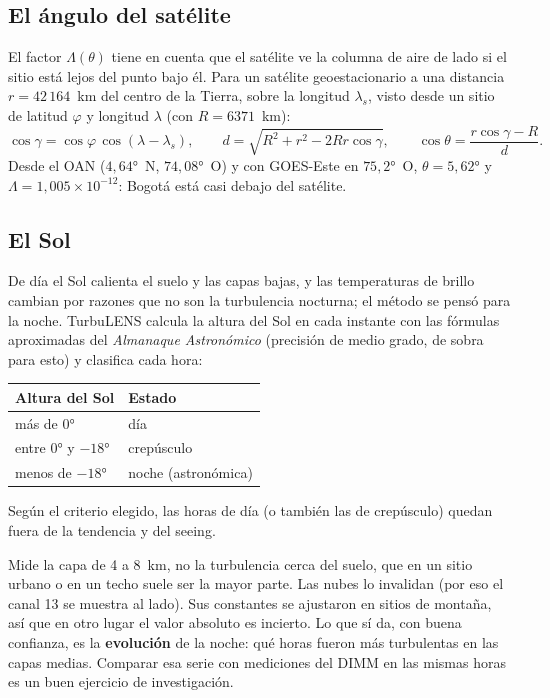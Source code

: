 \subsection{El ángulo del satélite}

El factor $\Lambda(\theta)$ tiene en cuenta que el satélite ve la columna de aire de lado si el sitio está lejos del punto
bajo él. Para un satélite geoestacionario a una distancia $r = 42\,164$~km del centro de la Tierra, sobre la longitud
$\lambda_s$, visto desde un sitio de latitud $\varphi$ y longitud $\lambda$ (con $R = 6371$~km):
\begin{equation}
\cos\gamma = \cos\varphi\,\cos(\lambda - \lambda_s),\qquad
d = \sqrt{R^2 + r^2 - 2Rr\cos\gamma},\qquad
\cos\theta = \frac{r\cos\gamma - R}{d}.
\end{equation}
Desde el OAN ($4{,}64°$~N, $74{,}08°$~O) y con GOES-Este en $75{,}2°$~O, $\theta = 5{,}62°$ y $\Lambda = 1{,}005\times10^{-12}$:
Bogotá está casi debajo del satélite.

\subsection{El Sol}

De día el Sol calienta el suelo y las capas bajas, y las temperaturas de brillo cambian por razones que no son la
turbulencia nocturna; el método se pensó para la noche. TurbuLENS calcula la altura del Sol en cada instante con las
fórmulas aproximadas del \emph{Almanaque Astronómico} (precisión de medio grado, de sobra para esto) y clasifica cada hora:
\begin{center}\small
\begin{tabular}{@{}l l@{}}
\toprule
Altura del Sol & Estado\\
\midrule
más de 0° & día\\
entre 0° y $-18°$ & crepúsculo\\
menos de $-18°$ & noche (astronómica)\\
\bottomrule
\end{tabular}
\end{center}
Según el criterio elegido, las horas de día (o también las de crepúsculo) quedan fuera de la tendencia y del seeing.

\begin{nota}
Mide la capa de 4 a 8~km, no la turbulencia cerca del suelo, que en un sitio urbano o en un techo suele ser la mayor
parte. Las nubes lo invalidan (por eso el canal 13 se muestra al lado). Sus constantes se ajustaron en sitios de
montaña, así que en otro lugar el valor absoluto es incierto. Lo que sí da, con buena confianza, es la \textbf{evolución}
de la noche: qué horas fueron más turbulentas en las capas medias. Comparar esa serie con mediciones del DIMM en las
mismas horas es un buen ejercicio de investigación.
\end{nota}
